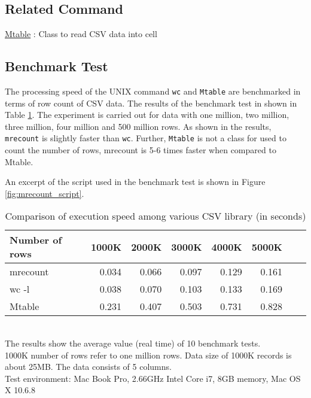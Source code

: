 \subsection{Related Command}
\hyperref[sect:mtableRB]{Mtable} : Class to read CSV data into cell 

\subsection{Benchmark Test}

The processing speed of the UNIX command \verb/wc/ and \verb/Mtable/ are benchmarked in terms of row count of CSV data. The results of the benchmark test in shown in Table \ref{tb:mrecount_bench1}. The experiment is carried out for data with one million, two million, three million, four million and 500 million rows. As shown in the results, \verb/mrecount/ is slightly faster than \verb/wc/. Further, \verb/Mtable/ is not a class for used to count the number of rows, mrecount is 5-6 times faster when compared to Mtable. 

An excerpt of the script used in the benchmark test is shown in Figure \ref{fig:mrecount_script}. 


\begin{table}[htpb]
\begin{center}
\caption{Comparison of execution speed among various CSV library (in seconds)\label{tb:mrecount_bench1}}
\begin{tabular}{l|r|r|r|r|r|r|r}
\hline
Number of rows      & 1000K & 2000K & 3000K & 4000K & 5000K \\ \hline
mrecount  & 0.034 & 0.066 & 0.097 & 0.129 & 0.161 \\
wc -l     & 0.038 & 0.070 & 0.103 & 0.133 & 0.169 \\
Mtable    & 0.231 & 0.407 & 0.503 & 0.731 & 0.828 \\
\hline
\end{tabular}  
{\small
\\The results show the average value (real time) of 10 benchmark tests.\\
1000K number of rows refer to one million rows. Data size of 1000K records is about 25MB. The data consists of 5 columns. \\
Test environment: Mac Book Pro, 2.66GHz Intel Core i7, 8GB memory, Mac OS X 10.6.8
}
\end{center}
\end{table}  

